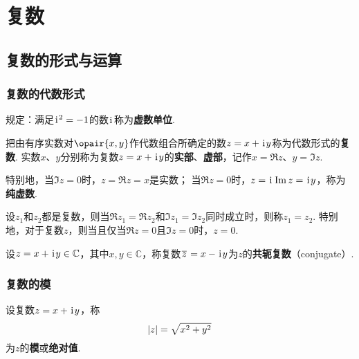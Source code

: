 \chapter{复数}
\begingroup

\section{复数的形式与运算}
\subsection{复数的代数形式}
\begin{definition}[虚数单位]
规定：满足\(\kern1pt\mathrm{i}\kern1pt^2=-1\)的数\(\kern1pt\mathrm{i}\kern1pt\)称为\textbf{虚数单位}.
\end{definition}

\begin{definition}[复数的代数形式]
把由有序实数对\(\opair{x,y}\)作代数组合所确定的数\(z=x+\kern1pt\mathrm{i}\kern1pt y\)称为代数形式的\textbf{复数}.
实数\(x\)、\(y\)分别称为复数\(z=x+\kern1pt\mathrm{i}\kern1pt y\)的\textbf{实部}、\textbf{虚部}，记作\(x=\Re z\)、\(y=\Im z\).

特别地，当\(\Im z=0\)时，\(z=\Re z=x\)是实数；
当\(\Re z=0\)时，\(z=\kern1pt\mathrm{i}\kern1pt\Im z=\kern1pt\mathrm{i}\kern1pt y\)，称为\textbf{纯虚数}.
\end{definition}

\begin{definition}[代数形式下复数相等条件]
设\(z_1\)和\(z_2\)都是复数，则当\(\Re z_1 = \Re z_2\)和\(\Im z_1 = \Im z_2\)同时成立时，则称\(z_1 = z_2\).
特别地，对于复数\(z\)，则当且仅当\(\Re z=0\)且\(\Im z=0\)时，\(z=0\).
\end{definition}

\begin{definition}[共轭复数]
设\(z=x + \kern1pt\mathrm{i}\kern1pt y \in\mathbb{C}\)，其中\(x,y\in\mathbb{C}\)，称复数\(\kern1pt\overline{z}\kern1pt=x - \kern1pt\mathrm{i}\kern1pt y\)为\(z\)的\textbf{共轭复数}（conjugate）.
\end{definition}

\subsection{复数的模}
\begin{definition}[复数的模]
设复数\(z = x + \kern1pt\mathrm{i}\kern1pt y\)，称\[
\abs{z} = \sqrt{x^2 + y^2}
\]为\(z\)的\textbf{模}或\textbf{绝对值}.
\end{definition}

